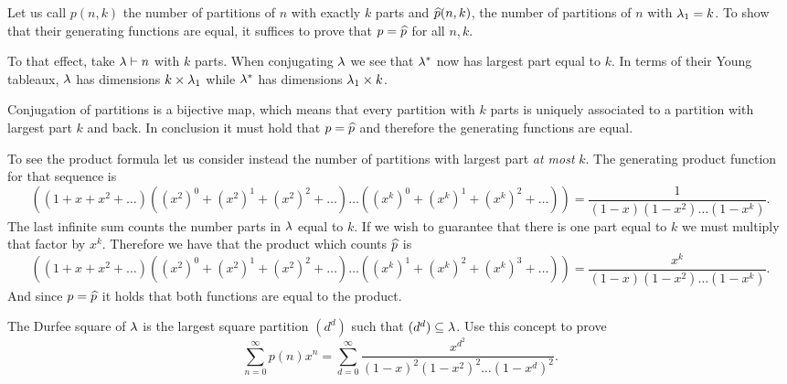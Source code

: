 \documentclass[12pt]{memoir}
\begin{document}
\begin{ptcbr}
Let us call $p(n,k)$ the number of partitions of $n$ with exactly $k$ parts and $\widehat{p}(n,k)$, the number of partitions of $n$ with $\lambda_1=k$. To show that their generating functions are equal, it suffices to prove that $p=\widehat{p}$ for all $n,k$.\par
To that effect, take $\lambda\vdash n$ with $k$ parts. When conjugating $\lambda$ we see that $\lambda^\ast$ now has largest part equal to $k$. In terms of their Young tableaux, $\lambda$ has dimensions $k\times\lambda_1$ while $\lambda^\ast$ has dimensions $\lambda_1\times k$.\par 
Conjugation of partitions is a bijective map, which means that every partition with $k$ parts is uniquely associated to a partition with largest part $k$ and back. In conclusion it must hold that $p=\widehat{p}$ and therefore the generating functions are equal.\par
To see the product formula let us consider instead the number of partitions with largest part \emph{at most} $k$. The generating product function for that sequence is 
$$\left((1+x+x^2+\dots)((x^2)^0+(x^2)^1+(x^2)^2+\dots)\dots((x^k)^0+(x^k)^1+(x^k)^2+\dots)\right)=\frac{1}{(1-x)(1-x^2)\dots(1-x^k)}.$$
The last infinite sum counts the number parts in $\lambda$ equal to $k$. If we wish to guarantee that there is one part equal to $k$ we must multiply that factor by $x^k$. Therefore we have that the product which counts $\widehat{p}$ is 
$$\left((1+x+x^2+\dots)((x^2)^0+(x^2)^1+(x^2)^2+\dots)\dots((x^k)^1+(x^k)^2+(x^k)^3+\dots)\right)=\frac{x^k}{(1-x)(1-x^2)\dots(1-x^k)}.$$
And since $p=\widehat{p}$ it holds that both functions are equal to the product.
\end{ptcbr}

\begin{Ej}
    The Durfee square of $\lambda$ is the largest square partition $(d^d)$ such that $(d^d)\subseteq \lambda$. Use this concept to prove
    $$\sum_{n=0}^\infty p(n)x^n=\sum_{d=0}^\infty \frac{x^{d^2}}{(1-x)^2(1-x^2)^2\dots(1-x^d)^2}.$$
\end{Ej}
\end{document}
